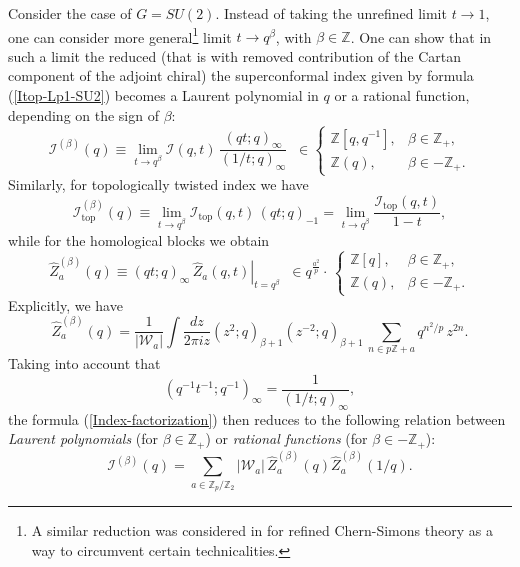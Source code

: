 \documentclass[hyper,letterpaper]{JHEP3}
\newcommand{\Z}{{\mathbb Z}}
\renewcommand{\hat}{\widehat}
\def\CI{{\mathcal I}}
\def\CW{{\mathcal W}}
\def\top{{\text{top}}}
\begin{document}
Consider the case of $G=SU(2)$. Instead of taking the unrefined limit $t\rightarrow 1$, one can consider more general\footnote{A similar reduction was considered in \cite{Aganagic:2011sg} for refined Chern-Simons theory as a way to circumvent certain technicalities.} limit $t\rightarrow q^\beta$, with $\beta\in\Z$. One can show that in such a limit the reduced (that is with removed contribution of the Cartan component of the adjoint chiral) the superconformal index given by formula (\ref{Itop-Lp1-SU2}) becomes a Laurent polynomial in $q$ or a rational function, depending on the sign of $\beta$:
\begin{equation}
	\CI^{(\beta)}(q)\equiv
	 \lim_{t\rightarrow q^\beta} \CI(q,t)\,\frac{(qt;q)_\infty}{(1/t;q)_\infty}\;\;\in
\left\{
\begin{array}{cl}
\Z[q,q^{-1}], & \beta\in \Z_+,\\
\Z(q), & \beta\in -\Z_+.
\end{array}
\right.
	 \label{ISU2-beta}
\end{equation}
Similarly, for topologically twisted index we have
\begin{equation}
	\CI^{(\beta)}_\top(q)\equiv
	 \lim_{t\rightarrow q^\beta} \CI_\top(q,t)\,(qt;q)_{-1}=
	  \lim_{t\rightarrow q^\beta} \frac{\CI_\top(q,t)}{1-t},
	 	 \label{ItopSU2-beta}
\end{equation}
while for the homological blocks we obtain
\begin{equation}
	\hat{Z}_a^{(\beta)}(q)\equiv
	 \left.{(qt;q)_\infty}\,\hat{Z}_a(q,t)\right|_{t=q^\beta}\;\;\in q^{\frac{a^2}{p}}
\cdot\,\left\{
\begin{array}{cl}
\Z[q], & \beta\in \Z_+,\\
\Z(q), & \beta\in -\Z_+.
\end{array}
\right.
	 \label{BlockBeta}
\end{equation}
Explicitly, we have
\begin{equation}
	\hat{Z}_a^{(\beta)}(q)=\frac{1}{|\CW_a|}\int\frac{dz}{2\pi i z}
	(z^2;q)_{\beta+1}(z^{-2};q)_{\beta+1}\,\sum_{n\in p\Z+a}q^{n^2/p}\,z^{2n}.
	\label{BlockBeta1}
\end{equation}
Taking into account that
\begin{equation}
	(q^{-1}t^{-1};q^{-1})_\infty=\frac{1}{(1/t;q)_\infty},
\end{equation}
the formula (\ref{Index-factorization}) then reduces to the following relation between \textit{Laurent polynomials} (for $\beta\in \Z_+$) or \textit{rational functions} (for $\beta\in-\Z_+$):
\begin{equation}
	\CI^{(\beta)}(q)=\sum_{a\in \Z_p/\Z_2}
	|\CW_a|\,\hat{Z}_a^{(\beta)}(q)\hat{Z}_a^{(\beta)}(1/q).
	\label{Ibeta-factorization}
\end{equation}
\end{document}
